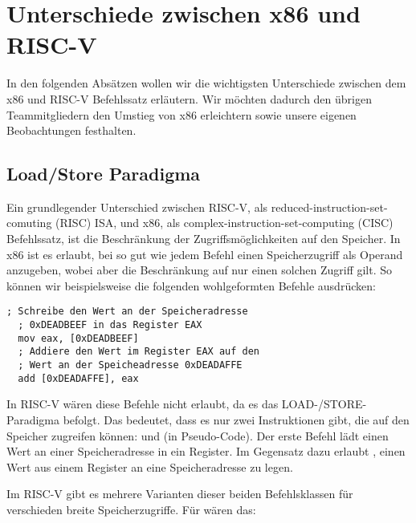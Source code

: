 \section{Unterschiede zwischen x86 und RISC-V}

In den folgenden Absätzen wollen wir die wichtigsten Unterschiede zwischen dem
x86 und RISC-V Befehlssatz erläutern. Wir möchten dadurch den übrigen
Teammitgliedern den Umstieg von x86 erleichtern sowie unsere eigenen
Beobachtungen festhalten.

\subsection{Load/Store Paradigma}

Ein grundlegender Unterschied zwischen RISC-V, als
reduced-instruction-set-comuting (RISC) ISA, und x86, als
complex-instruction-set-computing (CISC) Befehlssatz, ist die Beschränkung der
Zugriffsmöglichkeiten auf den Speicher. In x86 ist es erlaubt, bei so gut wie
jedem Befehl einen Speicherzugriff als Operand anzugeben, wobei aber die
Beschränkung auf nur einen solchen Zugriff gilt. So können wir beispielsweise
die folgenden wohlgeformten Befehle ausdrücken:

\begin{lstlisting}[style=x86Assembler]
  ; Schreibe den Wert an der Speicheradresse
  ; 0xDEADBEEF in das Register EAX
  mov eax, [0xDEADBEEF]
  ; Addiere den Wert im Register EAX auf den
  ; Wert an der Speicheadresse 0xDEADAFFE
  add [0xDEADAFFE], eax
\end{lstlisting}

In RISC-V wären diese Befehle nicht erlaubt, da es das LOAD-/STORE-Paradigma
befolgt. Das bedeutet, dass es nur zwei Instruktionen gibt, die auf den Speicher
zugreifen können:  und  (in Pseudo-Code). Der erste
Befehl lädt einen Wert an einer Speicheradresse in ein Register. Im
Gegensatz dazu erlaubt , einen Wert aus einem Register an eine
Speicheradresse zu legen.

Im RISC-V gibt es mehrere Varianten dieser beiden Befehlsklassen für
verschieden breite Speicherzugriffe. Für  wären das:

